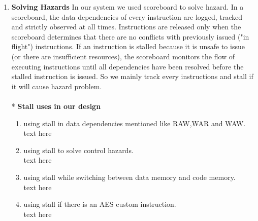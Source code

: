 \documentclass[../main.tex]{subfiles}
\begin{document}
\begin{enumerate}
\item \textbf{Solving Hazards}
In our system we used scoreboard to solve hazard.
In a scoreboard, the data dependencies of every instruction are logged, tracked and strictly observed at all times. Instructions are released only when the scoreboard determines that there are no conflicts with previously issued ("in flight") instructions. If an instruction is stalled because it is unsafe to issue (or there are insufficient resources), the scoreboard monitors the flow of executing instructions until all dependencies have been resolved before the stalled instruction is issued.
So we mainly track every instructions and stall if it will cause hazard problem.\\
\\* \textbf {Stall uses in our design}
\begin{enumerate}
    \item using stall in  data dependencies mentioned like RAW,WAR and WAW.\\
    text here
    \item using stall to solve control hazards.\\
        text here

    \item using stall while switching between data memory and code memory.\\
        text here

    \item using stall if there is an AES custom instruction.\\
       text here

\end{enumerate}


\end{enumerate}
\end{document}
